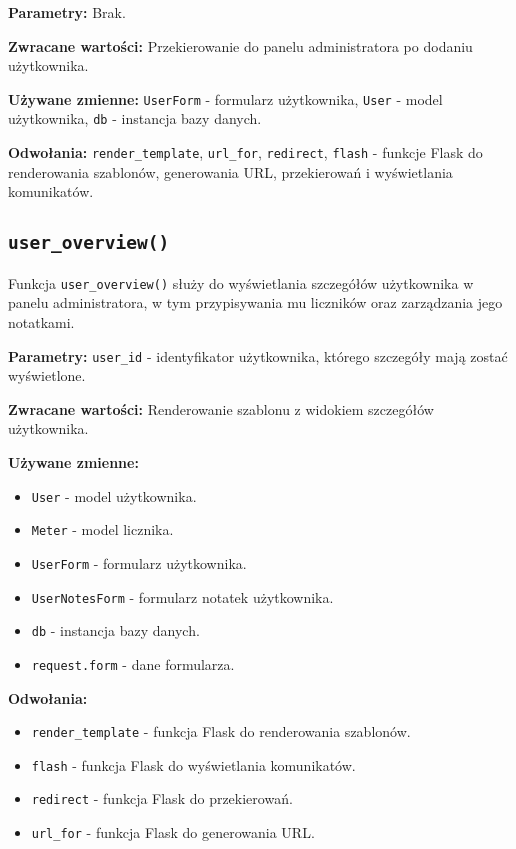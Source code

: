 \documentclass[12pt,a4paper]{report}
\begin{document}
\textbf{Parametry:} Brak.

\textbf{Zwracane wartości:} Przekierowanie do panelu administratora po dodaniu użytkownika.

\textbf{Używane zmienne:} \texttt{UserForm} - formularz użytkownika, \texttt{User} - model użytkownika, \texttt{db} - instancja bazy danych.

\textbf{Odwołania:} \texttt{render\_template}, \texttt{url\_for}, \texttt{redirect}, \texttt{flash} - funkcje Flask do renderowania szablonów, generowania URL, przekierowań i wyświetlania komunikatów.

\subsection{\texttt{user\_overview()}}
\label{sec:user_overview}
Funkcja \texttt{user\_overview()} służy do wyświetlania szczegółów użytkownika w panelu administratora, w tym przypisywania mu liczników oraz zarządzania jego notatkami.

\textbf{Parametry:} \texttt{user\_id} - identyfikator użytkownika, którego szczegóły mają zostać wyświetlone.

\textbf{Zwracane wartości:} Renderowanie szablonu z widokiem szczegółów użytkownika.

\textbf{Używane zmienne:}
\begin{itemize}
    \item \texttt{User} - model użytkownika.
    \item \texttt{Meter} - model licznika.
    \item \texttt{UserForm} - formularz użytkownika.
    \item \texttt{UserNotesForm} - formularz notatek użytkownika.
    \item \texttt{db} - instancja bazy danych.
    \item \texttt{request.form} - dane formularza.
\end{itemize}

\textbf{Odwołania:}
\begin{itemize}
    \item \texttt{render\_template} - funkcja Flask do renderowania szablonów.
    \item \texttt{flash} - funkcja Flask do wyświetlania komunikatów.
    \item \texttt{redirect} - funkcja Flask do przekierowań.
    \item \texttt{url\_for} - funkcja Flask do generowania URL.
\end{itemize}
\end{document}
